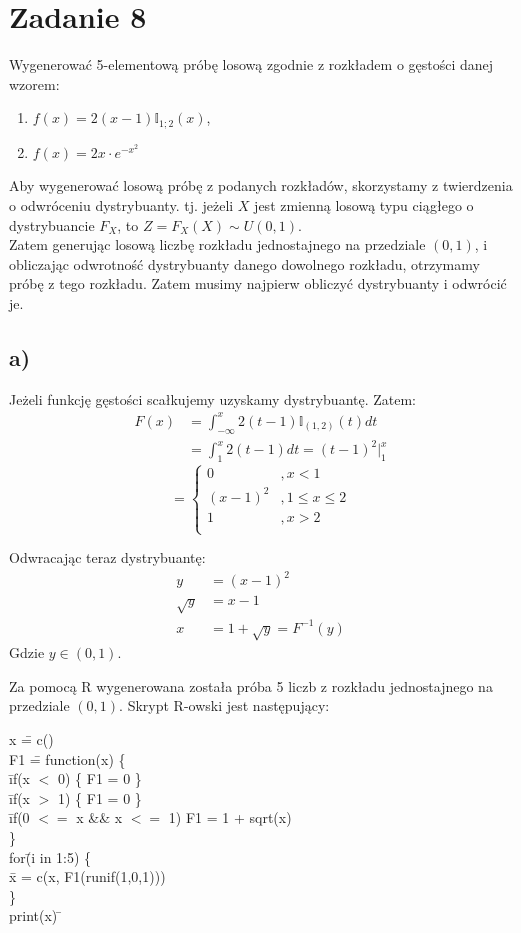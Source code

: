 \documentclass{article}
\begin{document}
\newpage
\section*{Zadanie 8}
Wygenerować 5-elementową próbę losową zgodnie z rozkładem o gęstości danej
wzorem:
\begin{enumerate}[label = \alph*)]
\item $f(x) = 2(x-1)\mathbb{I}_{1;2}(x)$,
\item $f(x) = 2x \cdot e^{-x^2}$
\end{enumerate}

Aby wygenerować losową próbę z podanych rozkładów, skorzystamy z twierdzenia o odwróceniu dystrybuanty. tj. jeżeli $X$ jest zmienną losową typu ciągłego o dystrybuancie $F_X$, to $Z = F_X(X) \sim U(0,1)$. \\
Zatem generując losową liczbę rozkładu jednostajnego na przedziale $(0,1)$, i obliczając odwrotność dystrybuanty danego dowolnego rozkładu, otrzymamy próbę z tego rozkładu. Zatem musimy najpierw obliczyć dystrybuanty i odwrócić je.

\subsection*{a)}
Jeżeli funkcję gęstości scałkujemy uzyskamy dystrybuantę. Zatem:
\begin{align*}
F(x) &= \int_{-\infty}^{x} 2(t-1) \mathbb{I}_{(1,2)}(t) dt \\
&= \int_{1}^{x} 2(t-1) dt = (t-1)^2 \Big\vert_{1}^{x}
\end{align*}
\[
= \left\{
\begin{array}{cc} 0 &, x < 1 \\ (x-1)^2 &, 1 \leq x \leq 2 \\ 1 &, x > 2 \\ \end{array}
\right.
\]

Odwracając teraz dystrybuantę:
\begin{align*}
y &= (x-1)^2 \\
\sqrt{y} &= x-1 \\
x &= 1 + \sqrt{y} = F^{-1}(y)
\end{align*}
Gdzie $y\in(0,1)$. \\
\par
Za pomocą R wygenerowana została próba 5 liczb z rozkładu jednostajnego na przedziale $(0,1)$. Skrypt R-owski jest następujący:
{\selectfont
\begin{tabbing}
x \= = c() \\
F1 \= = function(x) \{ \+ \\
	\= if(x $<$ 0) \{ F1 = 0 \} \\
	\= if(x $>$ 1) \{ F1 = 0 \} \\
	\= if(0 $<=$ x \&\& x $<=$ 1) { F1 = 1 + sqrt(x) } \- \\
\} \= \\
for\=(i in 1:5) \{ \+ \\
	\= x = c(x, F1(runif(1,0,1))) \- \\
\} \= \\
print(x) \=
\end{tabbing}
}
\end{document}
